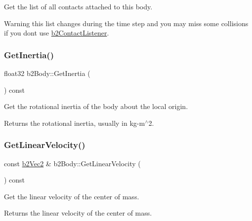 Get the list of all contacts attached to this body. \begin{DoxyWarning}{Warning}
this list changes during the time step and you may miss some collisions if you don\textquotesingle{}t use \hyperlink{classb2_contact_listener}{b2\+Contact\+Listener}. 
\end{DoxyWarning}
\mbox{\label{classb2_body_a60929c13e4b6548492dca5ec79f159db}} 
\subsubsection{\texorpdfstring{Get\+Inertia()}{GetInertia()}}
{\footnotesize\ttfamily float32 b2\+Body\+::\+Get\+Inertia (\begin{DoxyParamCaption}{ }\end{DoxyParamCaption}) const\hspace{0.3cm}{\ttfamily [inline]}}

Get the rotational inertia of the body about the local origin. \begin{DoxyReturn}{Returns}
the rotational inertia, usually in kg-\/m$^\wedge$2. 
\end{DoxyReturn}
\mbox{\label{classb2_body_a8fcaf842141320701057f679dff90b89}} 
\subsubsection{\texorpdfstring{Get\+Linear\+Velocity()}{GetLinearVelocity()}}
{\footnotesize\ttfamily const \hyperlink{structb2_vec2}{b2\+Vec2} \& b2\+Body\+::\+Get\+Linear\+Velocity (\begin{DoxyParamCaption}{ }\end{DoxyParamCaption}) const\hspace{0.3cm}{\ttfamily [inline]}}

Get the linear velocity of the center of mass. \begin{DoxyReturn}{Returns}
the linear velocity of the center of mass. 
\end{DoxyReturn}
\mbox{\label{classb2_body_a0ac0a4ad6ac3c7804652d9994239dcbd}} 
